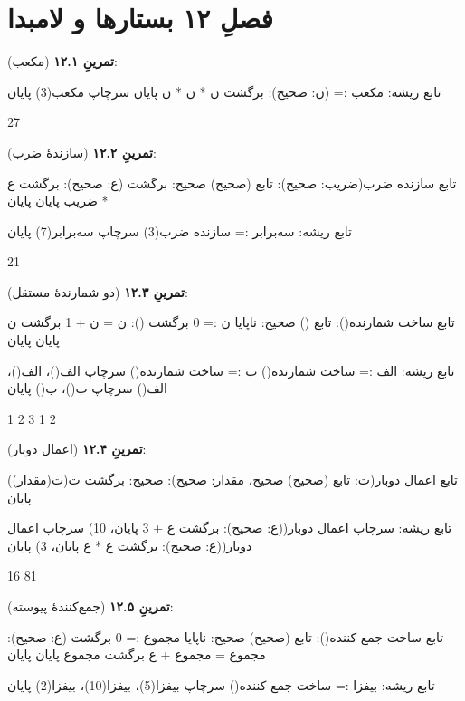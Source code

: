 \section*{فصلِ ۱۲ بستارها و لامبدا}
{}

\textbf{تمرینِ ۱۲.۱} (مکعب):
\begin{salamfa}
تابع ریشه:
    مکعب := (ن: صحیح): برگشت ن * ن * ن پایان
    سرچاپ مکعب(3)
پایان
\end{salamfa}

\begin{progoutfa}
27
\end{progoutfa}

\textbf{تمرینِ ۱۲.۲} (سازندهٔ ضرب):
\begin{salamfa}
تابع سازنده ضرب(ضریب: صحیح): تابع (صحیح) صحیح:
    برگشت (ع: صحیح): برگشت ع * ضریب پایان
پایان

تابع ریشه:
    سه‌برابر := سازنده ضرب(3)
    سرچاپ سه‌برابر(7)
پایان
\end{salamfa}

\begin{progoutfa}
21
\end{progoutfa}

\textbf{تمرینِ ۱۲.۳} (دو شمارندهٔ مستقل):
\begin{salamfa}
تابع ساخت شمارنده(): تابع () صحیح:
    ناپایا ن := 0
    برگشت ():
        ن = ن + 1
        برگشت ن
    پایان
پایان

تابع ریشه:
    الف := ساخت شمارنده()
    ب := ساخت شمارنده()
    سرچاپ الف()، الف()، الف()
    سرچاپ ب()، ب()
پایان
\end{salamfa}

\begin{progoutfa}
1 2 3
1 2
\end{progoutfa}

\textbf{تمرینِ ۱۲.۴} (اعمال دوبار):
\begin{salamfa}
تابع اعمال دوبار(ت: تابع (صحیح) صحیح، مقدار: صحیح): صحیح:
    برگشت ت(ت(مقدار))
پایان

تابع ریشه:
    سرچاپ اعمال دوبار((ع: صحیح): برگشت ع + 3 پایان، 10)
    سرچاپ اعمال دوبار((ع: صحیح): برگشت ع * ع پایان، 3)
پایان
\end{salamfa}

\begin{progoutfa}
16
81
\end{progoutfa}

\textbf{تمرینِ ۱۲.۵} (جمع‌کنندهٔ پیوسته):
\begin{salamfa}
تابع ساخت جمع کننده(): تابع (صحیح) صحیح:
    ناپایا مجموع := 0
    برگشت (ع: صحیح):
        مجموع = مجموع + ع
        برگشت مجموع
    پایان
پایان

تابع ریشه:
    بیفزا := ساخت جمع کننده()
    سرچاپ بیفزا(5)، بیفزا(10)، بیفزا(2)
پایان
\end{salamfa}

